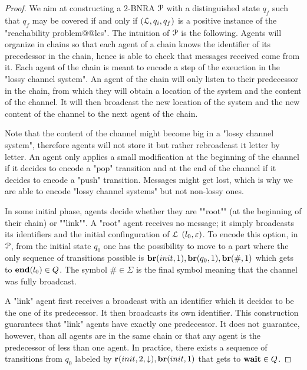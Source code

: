 \begin{proof}
We aim at constructing a $2$-BNRA $\mathcal{P}$ with a distinguished state $q_f$ such that $q_f$ may be covered if and only if $(\mathcal{L}, q_i, q_f)$ is a positive instance of the "reachability problem@@lcs". 
The intuition of $\mathcal{P}$ is the following. Agents will organize in chains so that each agent of a chain knows the identifier of its precedessor in the chain, hence is able to check that messages received come from it. Each agent of the chain is meant to encode a step of the exeuction in the "lossy channel system". 
An agent of the chain will only listen to their predecessor in the chain, from which they will obtain a location of the system and the content of the channel. It will then broadcast the new location of the system and the new content of the channel to the next agent of the chain. 

Note that the content of the channel might become big in a "lossy channel system", therefore agents will not store it but rather rebroadcast it letter by letter. An agent only applies a small modification at the beginning of the channel if it decides to encode a "pop" transition and at the end of the channel if it decides to encode a "push" transition. Messages might get lost, which is why we are able to encode "lossy channel systems" but not non-lossy ones.

In some initial phase, agents decide whether they are ""root"" (at the beginning of their chain) or ""link"". A "root" agent receives no message; it simply broadcasts its identifiers and the initial confinguration of $\mathcal{L}$ $(l_0,\varepsilon)$. To encode this option, in $\mathcal{P}$, from the initial state $q_0$ one has the possibility to move to a part where the only sequence of transitions possible is $\br{\mathsf{init}}{1}, \br{\mathsf{q_0}}{1}, \br{\mathsf{\#}}{1}$ which gets to $\mathbf{end}(l_0) \in Q$. The symbol $\mathsf{\#} \in \Sigma$ is the final symbol meaning that the channel was fully broadcast. 
 
A "link" agent first receives a broadcast with an identifier which it decides to be the one of its predecessor. It then broadcasts its own identifier. This construction guarantees that "link" agents have exactly one predecessor. It does not guarantee, however, than all agents are in the same chain or that any agent is the predecessor of less than one agent. In practice, there exists a sequence of transitions from $q_0$ labeled by $\rec{\mathsf{init}}{2}{\enregact}, \br{\mathsf{init}}{1}$ that gets to $\mathbf{wait} \in Q$. 


\end{proof}

